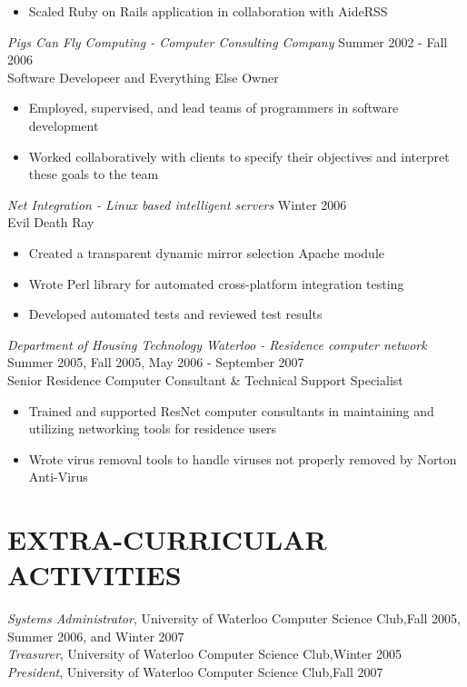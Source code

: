 \documentclass[10pt,line,margin=0.1]{newsres}
\begin{document}
\begin{resume}
\begin{itemize}
                  \item{Scaled Ruby on Rails application in collaboration with AideRSS}
                \end{itemize}
                {\sl Pigs Can Fly Computing - Computer Consulting Company} \hfill Summer 2002 - Fall 2006 \\
                Software Developeer and Everything Else Owner
                \begin{itemize}  \itemsep -2pt %
                  \item{Employed, supervised, and lead teams of programmers in software development}
                  \item{Worked collaboratively with clients to specify their objectives and interpret these goals to the team}
                \end{itemize}
                {\sl Net Integration - Linux based intelligent servers} \hfill Winter 2006 \\
                Evil Death Ray
                \begin{itemize}  \itemsep -2pt %
                  \item{Created a transparent dynamic mirror selection Apache module}
                  \item{Wrote Perl library for automated cross-platform integration testing}
                  \item{Developed automated tests and reviewed test results}
                \end{itemize}
                {\sl Department of Housing Technology Waterloo - Residence computer network} \hfill Summer 2005, Fall 2005, May 2006 - September 2007 \\
                Senior Residence Computer Consultant \& Technical Support Specialist
                \begin{itemize} \itemsep -2pt %
                  \item{Trained and supported ResNet computer consultants in maintaining and utilizing networking tools for residence users}
                  \item{Wrote virus removal tools to handle viruses not properly removed by Norton Anti-Virus}
                 \end{itemize}

 
\section{EXTRA-CURRICULAR \\ ACTIVITIES}             
        {\it Systems Administrator}, University of Waterloo Computer Science Club,\hfill  Fall 2005, Summer 2006, and Winter 2007 \\
        {\it Treasurer}, University of Waterloo Computer Science Club,\hfill Winter 2005 \\
        {\it President}, University of Waterloo Computer Science Club,\hfill Fall 2007 \\

\end{resume}
\end{document}
